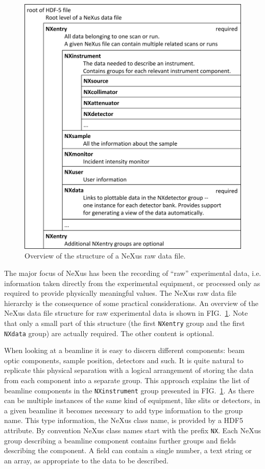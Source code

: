 \documentclass[%
 aip,
rsi,
 amsmath,amssymb,
 reprint,%
]{revtex4-1}
\begin{document}
\begin{figure}
\includegraphics[width=\columnwidth]{figure1}
\caption{\label{rawfile}Overview of the structure of a NeXus raw data file.}
\end{figure}

The major focus of NeXus has been the recording of ``raw'' experimental data, i.e. information taken directly from the experimental 
equipment, or processed only as required to provide physically meaningful values.
The NeXus raw data file hierarchy is the consequence of some practical considerations. 
An overview of the NeXus data file structure for raw experimental data is shown in FIG.~\ref{rawfile}.
Note that only a small part of this structure (the first \texttt{NXentry} group 
and the first \texttt{NXdata} group) are actually required.  The other content is optional.

When looking at a beamline it is easy to 
discern different components: beam optic components, sample position, detectors and such. It is quite natural to replicate this physical 
separation with a logical arrangement of storing the data from each component into a separate group. This approach explains the 
list of beamline components in the \texttt{NXinstrument} group presented in FIG.~\ref{rawfile}. 
As there can be multiple instances of the same kind of equipment, like slits or detectors, in a given beamline it becomes necessary
to add type information to the group name. This type information, the NeXus class name, is provided by a HDF5 attribute.
By convention NeXus class names start 
with the prefix \texttt{NX}. Each NeXus group describing a beamline component contains further groups and fields describing the component. 
A field can contain a single number, a text string or an array, as appropriate to the data to be described.  
\end{document}
